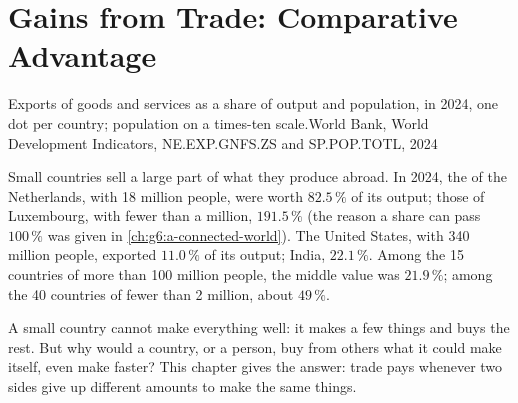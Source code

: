 \chapter{Gains from Trade: Comparative Advantage}\label{ch:g7:comparative-advantage}

\begin{openingchart}{Exports of goods and services as a share of output and
population, in 2024, one dot per country; population on a times-ten
scale.}{World Bank, World Development Indicators, NE.EXP.GNFS.ZS and SP.POP.TOTL,
2024}
\end{openingchart}

Small countries sell a large part of what they produce abroad. In 2024, the 
of the Netherlands, with 18 million people, were worth $82.5\,\%$ of its output; those
of Luxembourg, with fewer than a million, $191.5\,\%$ (the reason a share can pass
$100\,\%$ was given in \cref{ch:g6:a-connected-world}). The United States, with 340
million people, exported $11.0\,\%$ of its output; India, $22.1\,\%$. Among the 15
countries of more than 100 million people, the middle value was $21.9\,\%$; among the
40 countries of fewer than 2 million, about $49\,\%$.

A small country cannot make everything well: it makes a few things and buys the rest.
But why would a country, or a person, buy from others what it could make itself, even
make faster? This chapter gives the answer: trade pays whenever two sides give up
different amounts to make the same things.

